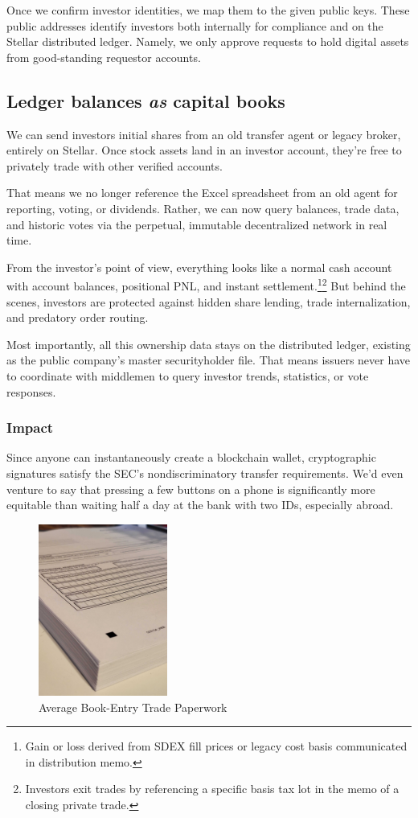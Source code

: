 \documentclass[11pt, english]{article}
\begin{document}
\begin{multicols}{2}
Once we confirm investor identities, we map them to the given public keys. These public addresses identify investors both internally for compliance and on the Stellar distributed ledger. Namely, we only approve requests to hold digital assets from good-standing requestor accounts.


\subsection{Ledger balances \textit{as} capital books}

We can send investors initial shares from an old transfer agent or legacy broker, entirely on Stellar. Once stock assets land in an investor account, they're free to privately trade with other verified accounts.

That means we no longer reference the Excel spreadsheet from an old agent for reporting, voting, or dividends. Rather, we can now query balances, trade data, and historic votes via the perpetual, immutable decentralized network in real time.

From the investor's point of view, everything looks like a normal cash account with account balances, positional PNL, and instant settlement.\footnote{Gain or loss derived from SDEX fill prices or legacy cost basis communicated in distribution memo.}\footnote{Investors exit trades by referencing a specific basis tax lot in the memo of a closing private trade.} But behind the scenes, investors are protected against hidden share lending, trade internalization, and predatory order routing.

Most importantly, all this ownership data stays on the distributed ledger, existing as the public company's master securityholder file. That means issuers never have to coordinate with middlemen to query investor trends, statistics, or vote responses.

\subsubsection{Impact}

Since anyone can instantaneously create a blockchain wallet, cryptographic signatures satisfy the SEC's nondiscriminatory transfer requirements. We'd even venture to say that pressing a few buttons on a phone is significantly more equitable than waiting half a day at the bank with two IDs, especially abroad.

\begin{figure}[H]
    \centering
    \includegraphics[width=120pt]{paperwork.jpg}
    \caption{Average Book-Entry Trade Paperwork}
\end{figure}


\end{multicols}
\end{document}
